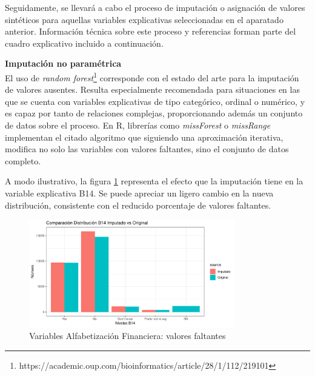 \documentclass[a4paper, 11pt]{article}
\begin{document}
Seguidamente, se llevará a cabo el proceso de imputación o asignación de valores
sintéticos para aquellas variables explicativas seleccionadas en el aparatado anterior.
Información técnica sobre este proceso y referencias forman parte del cuadro 
explicativo incluido a continuación.
\hspace{3em}

\begin{center}
\colorbox{gray!15}{
\begin{minipage}{0.8\textwidth}
\textbf{Imputación no paramétrica}\\
  El uso de \textit{random forest}\footnote{https://academic.oup.com/bioinformatics/article/28/1/112/219101} corresponde con el estado del arte para la imputación de
  valores ausentes. Resulta especialmente recomendada para situaciones en las que se
  cuenta con variables explicativas de tipo categórico, ordinal o numérico, y es capaz
  por tanto de relaciones complejas, proporcionando además un conjunto de datos sobre
  el proceso. En R, librerías como \textit{missForest} o \textit{missRange} implementan
  el citado algoritmo que siguiendo una aproximación iterativa, modifica no solo las
  variables con valores faltantes, sino el conjunto de datos completo.
\end{minipage}}
\end{center}

A modo ilustrativo, la figura \ref{fig:Analysis_MV_B14} representa el efecto que la 
imputación tiene en la variable explicativa B14. Se puede apreciar un ligero cambio en 
la nueva distribución, consistente con el reducido porcentaje de valores faltantes.

\begin{figure}[ht]
    \centering
    \includegraphics[width=0.8\textwidth]{images/Analysis_MV_B14.pdf} 
    \caption{Variables Alfabetización Financiera: valores faltantes}
    \label{fig:Analysis_MV_B14}
\end{figure}
\end{document}
